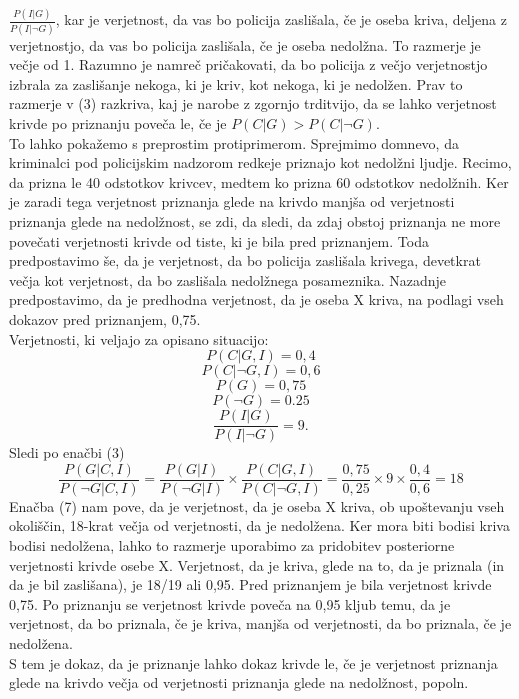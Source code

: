 \documentclass[12pt,a4paper]{amsart}
\theoremstyle{definition} %
\theoremstyle{plain} %
\begin{document}
$\frac{P(I \lvert G)}{P(I \lvert \neg G)}$, kar je verjetnost, da vas bo policija zaslišala, če je oseba kriva, deljena z verjetnostjo, da vas bo policija 
zaslišala, če je oseba nedolžna. To razmerje je večje od 1. Razumno je namreč pričakovati, da bo policija z večjo verjetnostjo izbrala za zaslišanje nekoga, 
ki je kriv, kot nekoga, ki je nedolžen. Prav to razmerje v (3) razkriva, kaj je narobe z zgornjo trditvijo, da se lahko verjetnost krivde po priznanju poveča le, 
če je $P(C \lvert G) > P(C \lvert \neg G)$. \\
To lahko pokažemo s preprostim protiprimerom. Sprejmimo domnevo, da kriminalci pod policijskim nadzorom redkeje priznajo kot nedolžni ljudje. Recimo, da prizna 
le 40 odstotkov krivcev, medtem ko prizna 60 odstotkov nedolžnih. Ker je zaradi tega verjetnost priznanja glede na krivdo manjša od verjetnosti priznanja glede 
na nedolžnost, se zdi, da sledi, da zdaj obstoj priznanja ne more povečati verjetnosti krivde od tiste, ki je bila pred priznanjem. Toda predpostavimo še, 
da je verjetnost, da bo policija zaslišala krivega, devetkrat večja kot verjetnost, da bo zaslišala nedolžnega posameznika. Nazadnje predpostavimo, da je 
predhodna verjetnost, da je oseba X kriva, na podlagi vseh dokazov pred priznanjem, 0,75. \\
Verjetnosti, ki veljajo za opisano situacijo:
\[
    P(C \lvert G, I) = 0,4
\]
\[
    P(C \lvert \neg G, I) = 0,6
\]
\[
    P(G) = 0,75
\]
\[
    P(\neg G) = 0.25
\]
\[
    \frac{P(I \lvert G)}{P(I \lvert \neg G)} = 9.
\]
Sledi po enačbi (3)
\begin{equation}
    \frac{P(G \lvert C, I)}{P(\neg G \lvert C, I)}  = \frac{P(G \lvert I)}{P(\neg G \lvert I)}  \times \frac{P(C \lvert G, I)}{P(C \lvert \neg G, I)} = \frac{0,75}{0,25} \times 9 \times \frac{0,4}{0,6} = 18
\end{equation}
Enačba (7) nam pove, da je verjetnost, da je oseba X kriva, ob upoštevanju vseh okoliščin, 18-krat večja od verjetnosti, da je nedolžena. Ker mora biti 
bodisi kriva bodisi nedolžena, lahko to razmerje uporabimo za pridobitev posteriorne verjetnosti krivde osebe X. Verjetnost, da je kriva, glede na to, 
da je priznala (in da je bil zaslišana), je 18/19 ali 0,95. Pred priznanjem je bila verjetnost krivde 0,75. Po priznanju se verjetnost krivde poveča 
na 0,95 kljub temu, da je verjetnost, da bo priznala, če je kriva, manjša od verjetnosti, da bo priznala, če je nedolžena. \\
S tem je dokaz, da je priznanje lahko dokaz krivde le, če je verjetnost priznanja glede na krivdo večja od verjetnosti priznanja glede na nedolžnost, popoln.
\end{document}
